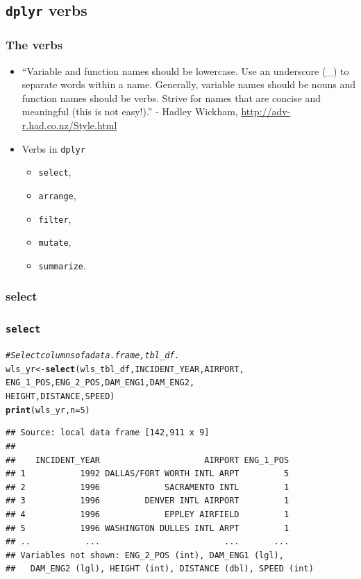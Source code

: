 \documentclass{beamer}\usepackage[]{graphicx}\usepackage[]{color}
\makeatletter
\newcommand{\hlnum}[1]{\textcolor[rgb]{0.686,0.059,0.569}{#1}}%
\newcommand{\hlcom}[1]{\textcolor[rgb]{0.678,0.584,0.686}{\textit{#1}}}%
\newcommand{\hlstd}[1]{\textcolor[rgb]{0.345,0.345,0.345}{#1}}%
\newcommand{\hlkwb}[1]{\textcolor[rgb]{0.69,0.353,0.396}{#1}}%
\newcommand{\hlkwc}[1]{\textcolor[rgb]{0.333,0.667,0.333}{#1}}%
\newcommand{\hlkwd}[1]{\textcolor[rgb]{0.737,0.353,0.396}{\textbf{#1}}}%
\newenvironment{kframe}{%
 \def\at@end@of@kframe{}%
 \ifinner\ifhmode%
  \def\at@end@of@kframe{\end{minipage}}%
  \begin{minipage}{\columnwidth}%
 \fi\fi%
 \def\FrameCommand##1{\hskip\@totalleftmargin \hskip-\fboxsep
 \colorbox{shadecolor}{##1}\hskip-\fboxsep
     \hskip-\linewidth \hskip-\@totalleftmargin \hskip\columnwidth}%
 \MakeFramed {\advance\hsize-\width
   \@totalleftmargin\z@ \linewidth\hsize
   \@setminipage}}%
 {\par\unskip\endMakeFramed%
 \at@end@of@kframe}
\newenvironment{knitrout}{}{} %
\makeatother
\begin{document}
\subsection{{\tt dplyr} verbs}%
\begin{frame}[fragile]
  \frametitle{The verbs}
  \begin{itemize}
    \item ``Variable and function names should be lowercase. Use an underscore
      (\_) to separate words within a name. Generally, variable names should be
      nouns and function names should be verbs. Strive for names that are
      concise and meaningful (this is not easy!).'' - Hadley Wickham,
      \url{http://adv-r.had.co.nz/Style.html}

    \item Verbs in {\tt dplyr} 
      \begin{itemize}
        \item {\tt select},
        \item {\tt arrange},
        \item {\tt filter},
        \item {\tt mutate}, 
        \item {\tt summarize}.
      \end{itemize}
  \end{itemize}
\end{frame} 

\subsubsection{select}%

\begin{frame}[fragile]
  \frametitle{{\tt select}}
\begin{knitrout}\footnotesize
{}\color{fgcolor}\begin{kframe}
\begin{alltt}
\hlcom{# Select columns of a data.frame, tbl_df.}
\hlstd{wls_yr} \hlkwb{<-} \hlkwd{select}\hlstd{(wls_tbl_df, INCIDENT_YEAR, AIRPORT,}
                 \hlstd{ENG_1_POS, ENG_2_POS, DAM_ENG1, DAM_ENG2,}
                 \hlstd{HEIGHT, DISTANCE, SPEED)}
\hlkwd{print}\hlstd{(wls_yr,} \hlkwc{n} \hlstd{=} \hlnum{5}\hlstd{)}
\end{alltt}
\begin{verbatim}
## Source: local data frame [142,911 x 9]
## 
##    INCIDENT_YEAR                     AIRPORT ENG_1_POS
## 1           1992 DALLAS/FORT WORTH INTL ARPT         5
## 2           1996             SACRAMENTO INTL         1
## 3           1996         DENVER INTL AIRPORT         1
## 4           1996             EPPLEY AIRFIELD         1
## 5           1996 WASHINGTON DULLES INTL ARPT         1
## ..           ...                         ...       ...
## Variables not shown: ENG_2_POS (int), DAM_ENG1 (lgl),
##   DAM_ENG2 (lgl), HEIGHT (int), DISTANCE (dbl), SPEED (int)
\end{verbatim}
\end{kframe}
\end{knitrout}
\end{frame} 
\end{document}
